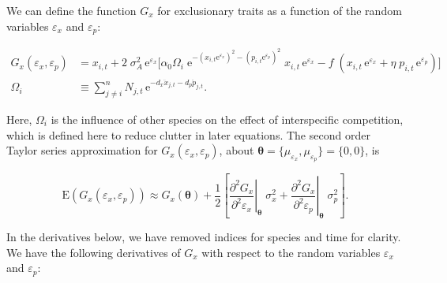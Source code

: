 We can define the function $G_x$ for exclusionary traits as a function 
of the random variables $\varepsilon_{x}$ and $\varepsilon_{p}$:

\begin{equation*}
\begin{split}
    G_x(\varepsilon_{x}, \varepsilon_{p}) &= x_{i,t} + 2 \; \sigma_A^2 \, \text{e}^{\varepsilon_x}
    \Bigg[
        \alpha_0
            \Omega_i \;
            \text{e}^{-(x_{i,t} \text{e}^{\varepsilon_{x}})^2 - (p_{i,t} \text{e}^{\varepsilon_{p}})^2} \; x_{i,t} \, 
            \text{e}^{\varepsilon_{x}}
        - f \; ( x_{i,t} \, \text{e}^{\varepsilon_{x}} + \eta \; p_{i,t} \,
            \text{e}^{\varepsilon_{p}} )
    \Bigg] \\
    \Omega_i &\equiv \sum_{j \ne i}^{n}{ N_{j,t} \, \textrm{e}^{
                    - d_x \ddot{x}_{j,t} - d_p \ddot{p}_{j,t} } }
    \textrm{.}
\end{split}
\end{equation*}

Here, $\Omega_i$ is the influence of other species on the effect of
interspecific competition,
which is defined here to reduce clutter in later equations.
The second order Taylor series approximation for $G_x(\varepsilon_{x}, \varepsilon_{p})$,
about $\bm{\theta} = \{ \mu_{\varepsilon_{x}}, \mu_{\varepsilon_{p}} \} = \{ 0, 0 \}$, is

\begin{equation}
\label{eq:taylor-expansion-outline}
    \text{E}(G_x(\varepsilon_{x}, \varepsilon_{p})) \approx G_x(\bm{\theta}) + 
        \frac{1}{2} \left[ 
            \left. \frac{\partial^2 G_x}{\partial^2 \varepsilon_{x}} \right\lvert_{\bm{\theta}} \; \sigma^2_{x} +
            \left. \frac{\partial^2 G_x}{\partial^2 \varepsilon_{p}} \right\lvert_{\bm{\theta}} \; \sigma^2_{p}
        \right]
\text{.}
\end{equation}


In the derivatives below, we have removed indices for species and time for
clarity.
We have the following derivatives of $G_x$ with respect to the random variables
$\varepsilon_{x}$ and $\varepsilon_{p}$:

